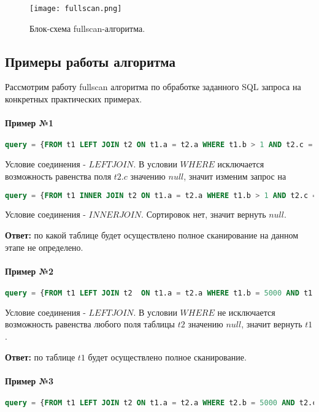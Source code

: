 \begin{figure}[h]
  \centering
  \texttt{[image: fullscan.png]}
  \caption{Блок-схема fullscan-алгоритма.}
  \label{img:fullscan}
\end{figure}


\subsection{Примеры работы алгоритма}

Рассмотрим работу fullscan алгоритма по обработке заданного SQL запроса на конкретных практических примерах.

\paragraph{Пример №1}

\begin{lstlisting}[language=SQL]
query = {FROM t1 LEFT JOIN t2 ON t1.a = t2.a WHERE t1.b > 1 AND t2.c = 5}
\end{lstlisting}

Условие соединения - $LEFT JOIN$. В условии $WHERE$ исключается возможность равенства поля $t2.c$ значению $null$, значит изменим запрос на
\begin{lstlisting}[language=SQL]
query = {FROM t1 INNER JOIN t2 ON t1.a = t2.a WHERE t1.b > 1 AND t2.c = 5}
\end{lstlisting}

Условие соединения - $INNER JOIN$. Сортировок нет, значит вернуть $null$. 

\textbf{Ответ:} по какой таблице будет осуществлено полное сканирование на данном этапе не определено.


\paragraph{Пример №2}
\begin{lstlisting}[language=SQL]
query = {FROM t1 LEFT JOIN t2  ON t1.a = t2.a WHERE t1.b = 5000 AND t1.c > 3 ORDER BY t2.c, t2.d}
\end{lstlisting}

Условие соединения - $LEFT JOIN$. В условии $WHERE$ не исключается возможность равенства любого поля таблицы $t2$ значению $null$, значит вернуть $t1$.

\textbf{Ответ:} по таблице $t1$ будет осуществлено полное сканирование. 


\paragraph{Пример №3}
\begin{lstlisting}[language=SQL]
query = {FROM t1 LEFT JOIN t2 ON t1.a = t2.a WHERE t2.b = 5000 AND t2.c > 3 ORDER BY t2.c, t2.d}
\end{lstlisting}

